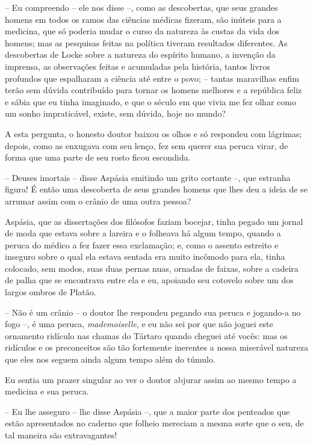  -- Eu compreendo -- ele nos disse --, como as descobertas, que seus
grandes homens em todos os ramos das ciências médicas fizeram, são
inúteis para a medicina, que só poderia mudar o curso da natureza às
custas da vida dos homens; mas as pesquisas feitas na política tiveram
resultados diferentes. As descobertas de Locke sobre a natureza do
espírito humano, a invenção da imprensa, as observações feitas e
acumuladas pela história, tantos livros profundos que espalharam a
ciência até entre o povo; -- tantas maravilhas enfim terão sem dúvida
contribuído para tornar os homens melhores e a república feliz e sábia
que eu tinha imaginado, e que o século em que vivia me fez olhar como
um sonho impraticável, existe, sem dúvida, hoje no mundo?

 A esta pergunta, o honesto doutor baixou os olhos e só respondeu com
lágrimas; depois, como as enxugava com seu lenço, fez sem querer sua
peruca virar, de forma que uma parte de seu rosto ficou escondida.

 -- Deuses imortais -- disse Aspásia emitindo um grito cortante --,
que estranha figura! É então uma descoberta de seus grandes homens que
lhes deu a ideia de se arrumar assim com o crânio de uma outra pessoa?

 Aspásia, que as dissertações dos filósofos faziam bocejar, tinha pegado
um jornal de moda que estava sobre a lareira e o folheava há algum
tempo, quando a peruca do médico a fez fazer essa exclamação; e, como o
assento estreito e inseguro sobre o qual ela estava sentada era muito
incômodo para ela, tinha colocado, sem modos, suas duas pernas nuas,
ornadas de faixas, sobre a cadeira de palha que se encontrava entre ela
e eu, apoiando seu cotovelo sobre um dos largos ombros de Platão.

 -- Não é um crânio -- o doutor lhe respondeu pegando sua peruca e
jogando-a no fogo --, é uma peruca, \textit{mademoiselle}, e eu não
sei por que não joguei este ornamento ridículo nas chamas do Tártaro
quando cheguei até vocês: mas os ridículos e os preconceitos são tão
fortemente inerentes a nossa miserável natureza que eles nos seguem
ainda algum tempo além do túmulo.

 Eu sentia um prazer singular ao ver o doutor abjurar assim ao mesmo
tempo a medicina e sua peruca.

 -- Eu lhe asseguro -- lhe disse Aspásia --, que a maior parte dos
penteados que estão apresentados no caderno que folheio mereciam a
mesma sorte que o seu, de tal maneira são extravagantes!

